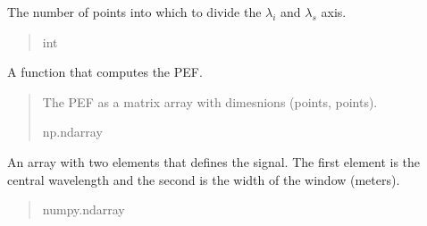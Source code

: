 \documentclass[a4paper,10pt,english]{sphinxmanual}
\begin{document}
\begin{fulllineitems}

\begin{fulllineitems}
\label{\detokenize{pump:pyjsa.pump.Pump.points}}
\pysigstartsignatures
{}
\pysigstopsignatures
\sphinxAtStartPar
The number of points into which to divide the \(\lambda_i\) and \(\lambda_s\) axis.
\begin{quote}\begin{description}
\sphinxAtStartPar
int

\end{description}\end{quote}

\end{fulllineitems}


\begin{fulllineitems}
\label{\detokenize{pump:pyjsa.pump.Pump.pump_envelope_function}}
\pysigstartsignatures
{}
\pysigstopsignatures
\sphinxAtStartPar
A function that computes the PEF.
\begin{quote}\begin{description}
\sphinxAtStartPar
The PEF as a matrix array with dimesnions (points, points).

\sphinxAtStartPar
np.ndarray

\end{description}\end{quote}

\end{fulllineitems}


\begin{fulllineitems}
\label{\detokenize{pump:pyjsa.pump.Pump.signal}}
\pysigstartsignatures
{}
\pysigstopsignatures
\sphinxAtStartPar
An array with two elements that defines the signal. The first element is the central wavelength and the second is the width of the window (meters).
\begin{quote}\begin{description}
\sphinxAtStartPar
numpy.ndarray


\end{description}
\end{quote}
\end{fulllineitems}
\end{fulllineitems}
\end{document}
